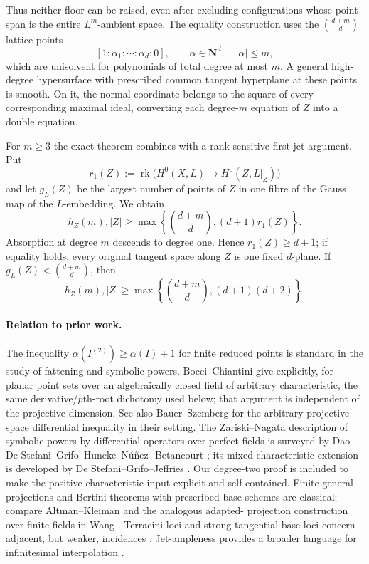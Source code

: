 \documentclass[11pt]{article}
\newcommand{\NN}{\mathbf N}
\newcommand{\rk}{\operatorname{rk}}
\begin{document}
Thus neither floor can be raised, even after excluding configurations whose
point span is the entire $L^m$-ambient space.  The equality construction uses
the $\binom{d+m}{d}$ lattice points
\[
 [1:\alpha_1:\cdots:\alpha_d:0],\qquad
 \alpha\in\NN^d,\quad |\alpha|\leq m,
\]
which are unisolvent for polynomials of total degree at most $m$.  A general
high-degree hypersurface with prescribed common tangent hyperplane at these
points is smooth.  On it, the normal coordinate belongs to the square of
every corresponding maximal ideal, converting each degree-$m$ equation of
$Z$ into a double equation.

For $m\geq3$ the exact theorem combines with a rank-sensitive first-jet
argument.  Put
\[
 r_1(Z):=\rk\bigl(H^0(X,L)\to H^0(Z,L|_Z)\bigr)
\]
and let $g_L(Z)$ be the largest number of points of $Z$ in one fibre of the
Gauss map of the $L$-embedding.  We obtain
\begin{equation}\label{eq:combined-intro}
 h_Z(m),|Z|\geq
 \max\left\{\binom{d+m}{d},(d+1)r_1(Z)\right\}.
\end{equation}
Absorption at degree $m$ descends to degree one.  Hence $r_1(Z)\geq d+1$;
if equality holds, every original tangent space along $Z$ is one fixed
$d$-plane.  If $g_L(Z)<\binom{d+m}{d}$, then
\begin{equation}\label{eq:gauss-intro}
 h_Z(m),|Z|\geq
 \max\left\{\binom{d+m}{d},(d+1)(d+2)\right\}.
\end{equation}

\paragraph{Relation to prior work.}
The inequality $\alpha(I^{(2)})\geq\alpha(I)+1$ for finite reduced points is
standard in the study of fattening and symbolic powers.  Bocci--Chiantini
\cite[Remark~2.2]{BocciChiantini2011} give explicitly, for planar point sets
over an algebraically closed field of arbitrary characteristic, the same
derivative/$p$th-root dichotomy used below; that argument is independent of
the projective dimension.  See also Bauer--Szemberg
\cite[Lemma~2.4]{BauerSzemberg2014} for the
arbitrary-projective-space differential inequality in their setting.  The
Zariski--Nagata description of symbolic powers by differential operators over
perfect fields is surveyed by Dao--De Stefani--Grifo--Huneke--N\'u\~nez-
Betancourt \cite[Proposition~2.14 and Exercise~2.15]{DaoEtAl2018}; its
mixed-characteristic extension is developed by De Stefani--Grifo--Jeffries
\cite{DeStefaniGrifoJeffries2020}.  Our degree-two proof is included to make
the positive-characteristic input explicit and self-contained.  Finite general
projections and Bertini theorems with prescribed base schemes are classical;
compare Altman--Kleiman \cite{AltmanKleiman1979} and the analogous adapted-
projection construction over finite fields in Wang \cite[Lemma~A.7]{Wang2022}.
Terracini loci and strong
tangential base loci concern adjacent, but weaker, incidences
\cite{BallicoChiantini2021,BallicoBrambillaSantarsiero2026}.  Jet-ampleness
provides a broader language for infinitesimal interpolation
\cite{BeltramettiDiRoccoSommese1999}.
\end{document}
